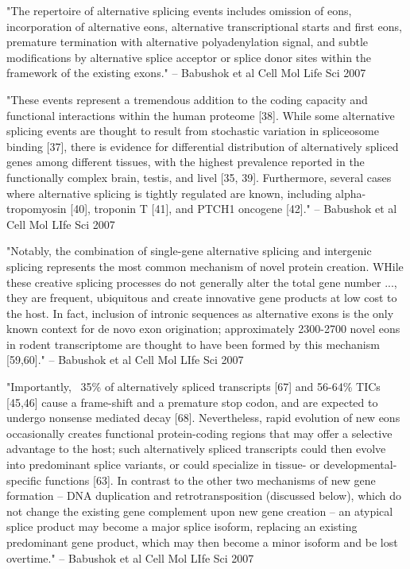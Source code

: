 \documentclass[10pt]{article}
\begin{document}
"The repertoire of alternative splicing events includes omission of eons, incorporation of alternative eons, alternative transcriptional starts and first eons, premature termination with alternative polyadenylation signal, and subtle modifications by alternative splice acceptor or splice donor sites within the framework of the existing exons." -- Babushok et al Cell Mol Life Sci 2007

"These events represent a tremendous addition to the coding capacity and functional interactions within the human proteome [38].  While some alternative splicing events are thought to result from stochastic variation in spliceosome binding [37], there is evidence for differential distribution of alternatively spliced genes among different tissues, with the highest prevalence reported in the functionally complex brain, testis, and livel [35, 39].  Furthermore, several cases where alternative splicing is tightly regulated are known, including alpha-tropomyosin [40], troponin T [41], and PTCH1 oncogene [42]."  -- Babushok et al Cell Mol LIfe Sci 2007

"Notably, the combination of single-gene alternative splicing and intergenic splicing represents the most common mechanism of novel protein creation.  WHile these creative splicing processes do not generally alter the total gene number ..., they are frequent, ubiquitous and create innovative gene products at low cost to the host.  In fact, inclusion of intronic sequences as alternative exons is the only known context for de novo exon origination; approximately 2300-2700 novel eons in rodent transcriptome are thought to have been formed by this mechanism [59,60]."  -- Babushok et al Cell Mol LIfe Sci 2007

"Importantly, ~35\% of alternatively spliced transcripts [67] and 56-64\% TICs [45,46] cause a frame-shift and a premature stop codon, and are expected to undergo nonsense mediated decay [68].  Nevertheless, rapid evolution of new eons occasionally creates functional protein-coding regions that may offer a selective advantage to the host; such alternatively spliced transcripts could then evolve into predominant splice variants, or could specialize in tissue- or developmental-specific functions [63].  In contrast to the other two mechanisms of new gene formation -- DNA duplication and retrotransposition (discussed below), which do not change the existing gene complement upon new gene creation -- an atypical splice product may become a major splice isoform, replacing an existing predominant gene product, which may then become a minor isoform and be lost overtime."  -- Babushok et al Cell Mol LIfe Sci 2007
\end{document}
